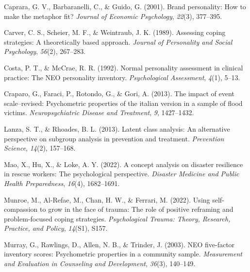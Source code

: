 \documentclass[
]{apa7}
\newlength{\cslhangindent}
\newlength{\cslentryspacingunit} %
\newenvironment{CSLReferences}[2] %
 {%
  \setlength{\parindent}{0pt}
  \ifodd #1
  \let\oldpar\par
  \def\par{\hangindent=\cslhangindent\oldpar}
  \fi
  \setlength{\parskip}{#2\cslentryspacingunit}
 }%
 {}
\begin{document}
\hypertarget{refs}{}
\begin{CSLReferences}{1}{0}
\leavevmode{}%
Caprara, G. V., Barbaranelli, C., \& Guido, G. (2001). Brand
personality: How to make the metaphor fit? \emph{Journal of Economic
Psychology}, \emph{22}(3), 377--395.

\leavevmode{}%
Carver, C. S., Scheier, M. F., \& Weintraub, J. K. (1989). Assessing
coping strategies: A theoretically based approach. \emph{Journal of
Personality and Social Psychology}, \emph{56}(2), 267--283.

\leavevmode{}%
Costa, P. T., \& McCrae, R. R. (1992). Normal personality assessment in
clinical practice: The NEO personality inventory. \emph{Psychological
Assessment}, \emph{4}(1), 5--13.

\leavevmode{}%
Craparo, G., Faraci, P., Rotondo, G., \& Gori, A. (2013). The impact of
event scale--revised: Psychometric properties of the italian version in
a sample of flood victims. \emph{Neuropsychiatric Disease and
Treatment}, \emph{9}, 1427--1432.

\leavevmode{}%
Lanza, S. T., \& Rhoades, B. L. (2013). Latent class analysis: An
alternative perspective on subgroup analysis in prevention and
treatment. \emph{Prevention Science}, \emph{14}(2), 157--168.

\leavevmode{}%
Mao, X., Hu, X., \& Loke, A. Y. (2022). A concept analysis on disaster
resilience in rescue workers: The psychological perspective.
\emph{Disaster Medicine and Public Health Preparedness}, \emph{16}(4),
1682--1691.

\leavevmode{}%
Munroe, M., Al-Refae, M., Chan, H. W., \& Ferrari, M. (2022). Using
self-compassion to grow in the face of trauma: The role of positive
reframing and problem-focused coping strategies. \emph{Psychological
Trauma: Theory, Research, Practice, and Policy}, \emph{14}(S1), S157.

\leavevmode{}%
Murray, G., Rawlings, D., Allen, N. B., \& Trinder, J. (2003). NEO
five-factor inventory scores: Psychometric properties in a community
sample. \emph{Measurement and Evaluation in Counseling and Development},
\emph{36}(3), 140--149.


\end{CSLReferences}
\end{document}
